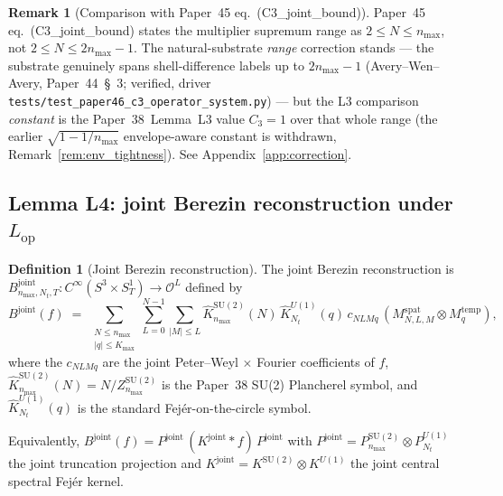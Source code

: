 \documentclass[11pt,a4paper]{article}
\theoremstyle{plain}
\theoremstyle{definition}
\newtheorem{definition}[theorem]{Definition}
\newtheorem{remark}[theorem]{Remark}
\newcommand{\nmax}{n_{\max}}
\newcommand{\Nt}{N_{t}}
\newcommand{\Kmax}{K_{\max}}
\newcommand{\Manifold}{S^{3}\times S^{1}_{T}}
\newcommand{\Op}{\mathcal{O}}
\newcommand{\SU}{\mathrm{SU}}
\newcommand{\Uone}{U(1)}
\newcommand{\Lop}{L_{\mathrm{op}}}
\newcommand{\Bjoint}{B^{\mathrm{joint}}}
\newcommand{\Pjoint}{P^{\mathrm{joint}}}
\newcommand{\Kjoint}{K^{\mathrm{joint}}}
\newcommand{\KSU}{K^{\SU(2)}}
\newcommand{\KU}{K^{\Uone}}
\newcommand{\spat}{\mathrm{spat}}
\newcommand{\temp}{\mathrm{temp}}
\newcommand{\Plancherel}{\hat}
\begin{document}
\begin{remark}[Comparison with Paper~45 eq.~(C3\_joint\_bound)]
\label{rem:vs_paper45_C3}
Paper~45 eq.~(C3\_joint\_bound) states the multiplier supremum range as
$2 \le N \le \nmax$, not $2 \le N \le 2\nmax - 1$. The natural-substrate
\emph{range} correction stands --- the substrate genuinely spans
shell-difference labels up to $2\nmax - 1$ (Avery--Wen--Avery, Paper~44~\S~3;
verified, driver \texttt{tests/test\_paper46\_c3\_operator\_system.py}) --- but the
L3 comparison \emph{constant} is the Paper~38~Lemma~L3 value $C_{3} = 1$ over
that whole range (the earlier $\sqrt{1 - 1/\nmax}$ envelope-aware constant is
withdrawn, Remark~\ref{rem:env_tightness}). See Appendix~\ref{app:correction}.
\end{remark}

\subsection{Lemma L4: joint Berezin reconstruction under $\Lop$}
\label{sec:L4}

\begin{definition}[Joint Berezin reconstruction]\label{def:joint_berezin}
The joint Berezin reconstruction is
$\Bjoint_{\nmax, \Nt, T} : C^{\infty}(\Manifold) \to \Op^{L}$ defined
by
\begin{equation}\label{eq:joint_berezin}
   \Bjoint(f) \;=\; \sum_{\substack{N \le \nmax \\ |q| \le \Kmax}}
   \sum_{L = 0}^{N - 1} \sum_{|M| \le L}
   \Plancherel{K}^{\SU(2)}_{\nmax}(N)\,\Plancherel{K}^{\Uone}_{\Nt}(q)\,
   c_{N L M q}\,(M^{\spat}_{N, L, M} \otimes M^{\temp}_{q}),
\end{equation}
where the $c_{N L M q}$ are the joint Peter--Weyl $\times$ Fourier
coefficients of $f$, $\Plancherel{K}^{\SU(2)}_{\nmax}(N) = N /
Z^{\SU(2)}_{\nmax}$ is the Paper~38 SU(2) Plancherel symbol, and
$\Plancherel{K}^{\Uone}_{\Nt}(q)$ is the standard Fej\'er-on-the-circle
symbol.
\end{definition}

Equivalently, $\Bjoint(f) = \Pjoint\,(\Kjoint \ast f)\,\Pjoint$ with
$\Pjoint = P^{\SU(2)}_{\nmax} \otimes P^{\Uone}_{\Nt}$ the joint
truncation projection and $\Kjoint = \KSU \otimes \KU$ the joint
central spectral Fej\'er kernel.
\end{document}
